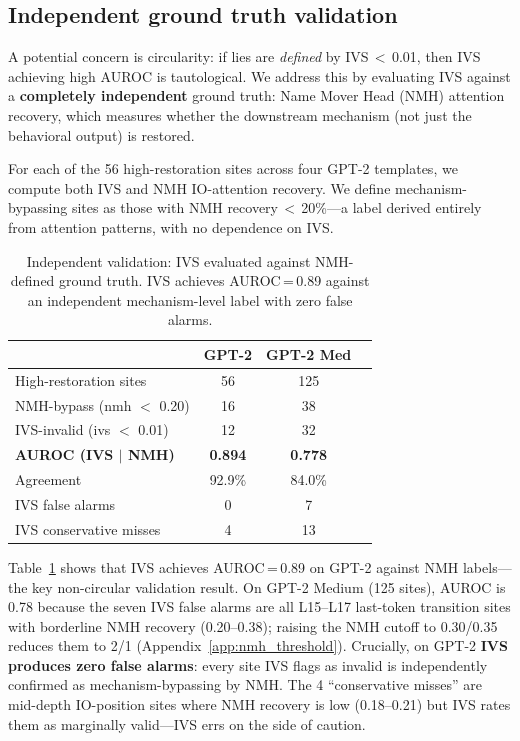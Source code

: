 \documentclass{article}
\begin{document}
\subsection{Independent ground truth validation}
\label{sec:independent}

A potential concern is circularity: if lies are \emph{defined} by IVS\,$<$\,0.01, then IVS achieving high AUROC is tautological. We address this by evaluating IVS against a \textbf{completely independent} ground truth: Name Mover Head (NMH) attention recovery, which measures whether the downstream mechanism (not just the behavioral output) is restored.

For each of the 56 high-restoration sites across four GPT-2 templates, we compute both IVS and NMH IO-attention recovery. We define mechanism-bypassing sites as those with NMH recovery\,$<$\,20\%---a label derived entirely from attention patterns, with no dependence on IVS.

\begin{table}[h]
\caption{Independent validation: IVS evaluated against NMH-defined ground truth. IVS achieves AUROC\,=\,0.89 against an independent mechanism-level label with zero false alarms.}
\label{tab:independent}
\vspace{-2mm}
\begin{center}\small
\begin{tabular}{lccc}
\toprule
& \textbf{GPT-2} & \textbf{GPT-2 Med} \\
\midrule
High-restoration sites & 56 & 125 \\
NMH-bypass (nmh $<$ 0.20) & 16 & 38 \\
IVS-invalid (ivs $<$ 0.01) & 12 & 32 \\
\textbf{AUROC (IVS $|$ NMH)} & \textbf{0.894} & \textbf{0.778} \\
Agreement & 92.9\% & 84.0\% \\
IVS false alarms & 0 & 7 \\
IVS conservative misses & 4 & 13 \\
\bottomrule
\end{tabular}
\end{center}
\vspace{-3mm}
\end{table}

Table~\ref{tab:independent} shows that IVS achieves AUROC\,=\,0.89 on GPT-2 against NMH labels---the key non-circular validation result. On GPT-2 Medium (125 sites), AUROC is 0.78 because the seven IVS false alarms are all L15--L17 last-token transition sites with borderline NMH recovery (0.20--0.38); raising the NMH cutoff to 0.30/0.35 reduces them to 2/1 (Appendix~\ref{app:nmh_threshold}). Crucially, on GPT-2 \textbf{IVS produces zero false alarms}: every site IVS flags as invalid is independently confirmed as mechanism-bypassing by NMH. The 4 ``conservative misses'' are mid-depth IO-position sites where NMH recovery is low (0.18--0.21) but IVS rates them as marginally valid---IVS errs on the side of caution.
\end{document}
